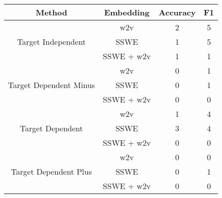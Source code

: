 \begin{tabular}{|c|c|c|c|}
\hline
Method &    Embedding   &  Accuracy &  F1 \\
\hline
\multirow{3}{*}{Target Independent} & w2v &         2 &   5 \\
& SSWE &         1 &   5 \\
& SSWE + w2v &         1 &   1 \\
\hline
\multirow{3}{*}{Target Dependent Minus} & w2v &         0 &   1 \\
& SSWE &         0 &   1 \\
& SSWE + w2v &         0 &   0 \\
\hline
\multirow{3}{*}{Target Dependent} & w2v &         1 &   4 \\
& SSWE &         3 &   4 \\
& SSWE + w2v &         0 &   0 \\
\hline
\multirow{3}{*}{Target Dependent Plus} & w2v &         0 &   0 \\
& SSWE &         0 &   1 \\
& SSWE + w2v &         0 &   0 \\ 
\hline
\end{tabular}